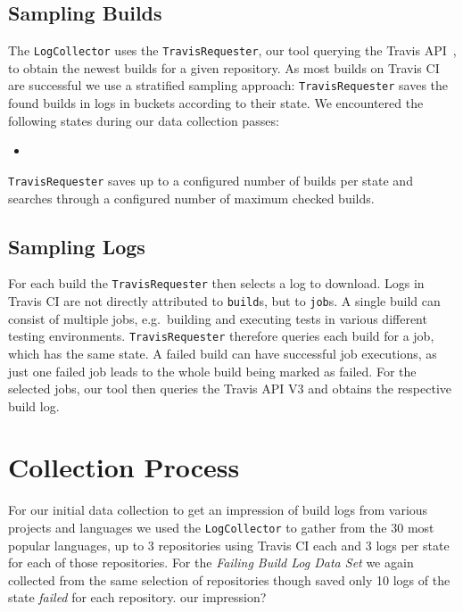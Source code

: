 \documentclass[\myrootdir/main.tex]{subfiles}
\begin{document}
\subsection{Sampling Builds}
The \texttt{LogCollector} uses the \texttt{TravisRequester}, our tool querying the Travis API~\cite{travisci2019apidoc}, to obtain the newest builds for a given repository.
As most builds on Travis CI are successful  we use a stratified sampling approach: \texttt{TravisRequester} saves the found builds in logs in buckets according to their state.
We encountered the following states during our data collection passes:
\begin{itemize}
	\item {}
\end{itemize}
\texttt{TravisRequester} saves up to a configured number of builds per state and searches through a configured number of maximum checked builds.

\subsection{Sampling Logs}
For each build the \texttt{TravisRequester} then selects a log to download.
Logs in Travis CI are not directly attributed to \texttt{build}s, but to \texttt{job}s.
A single build can consist of multiple jobs, e.g.\ building and executing tests in various different testing environments.
\texttt{TravisRequester} therefore queries each build for a job, which has the same state.
A failed build can have successful job executions, as just one failed job leads to the whole build being marked as failed.
For the selected jobs, our tool then queries the Travis API V3 and obtains the respective build log.


\section{Collection Process}
For our initial data collection to get an impression of build logs from various projects and languages we used the \texttt{LogCollector} to gather from the 30 most popular languages, up to 3 repositories using Travis CI each and 3 logs per state for each of those repositories.
For the \emph{Failing Build Log Data Set} we again collected from the same selection of repositories though saved only 10 logs of the state \emph{failed} for each repository.
our impression?
\end{document}
